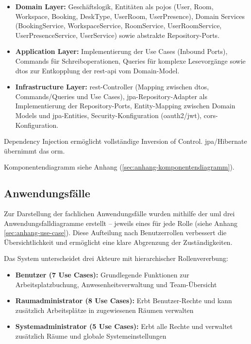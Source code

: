 \documentclass[11pt,a4paper]{report}
\begin{document}
\begin{itemize}
    \item \textbf{Domain Layer:} Geschäftslogik, Entitäten als \glspl{pojo} (User, Room, Workspace, Booking, DeskType, UserRoom, UserPresence), Domain Services (BookingService, WorkspaceService, RoomService, UserRoomService, UserPresenceService, UserService) sowie abstrakte Repository-Ports.
    \item \textbf{Application Layer:} Implementierung der Use Cases (Inbound Ports), Commands für Schreiboperationen, Queries für komplexe Lesevorgänge sowie \glspl{dto} zur Entkopplung der \gls{rest}-\gls{api} vom Domain-Model.
    \item \textbf{Infrastructure Layer:} \gls{rest}-Controller (Mapping zwischen \glspl{dto}, Commands/Queries und Use Cases), \gls{jpa}-Repository-Adapter als Implementierung der Repository-Ports, Entity-Mapping zwischen Domain Models und \gls{jpa}-Entities, Security-Konfiguration (\gls{oauth2}/\gls{jwt}), \gls{cors}-Konfiguration.
\end{itemize}

Dependency Injection ermöglicht vollständige Inversion of Control. \gls{jpa}/Hibernate übernimmt das \gls{orm}.

Komponentendiagramm siehe Anhang (\ref{sec:anhang-komponentendiagramm}).

\subsection{Anwendungsfälle}

Zur Darstellung der fachlichen Anwendungsfälle wurden mithilfe der \gls{uml} drei Anwendungsfalldiagramme erstellt -- jeweils eines für jede Rolle (siehe Anhang \ref{sec:anhang-use-case}). Diese Aufteilung nach Benutzerrollen verbessert die Übersichtlichkeit und ermöglicht eine klare Abgrenzung der Zuständigkeiten.

Das System unterscheidet drei Akteure mit hierarchischer Rollenvererbung:

\begin{itemize}
    \item \textbf{Benutzer (7 Use Cases):} Grundlegende Funktionen zur Arbeitsplatzbuchung, Anwesenheitsverwaltung und Team-Übersicht
    \item \textbf{Raumadministrator (8 Use Cases):} Erbt Benutzer-Rechte und kann zusätzlich Arbeitsplätze in zugewiesenen Räumen verwalten
    \item \textbf{Systemadministrator (5 Use Cases):} Erbt alle Rechte und verwaltet zusätzlich Räume und globale Systemeinstellungen
\end{itemize}
\end{document}
